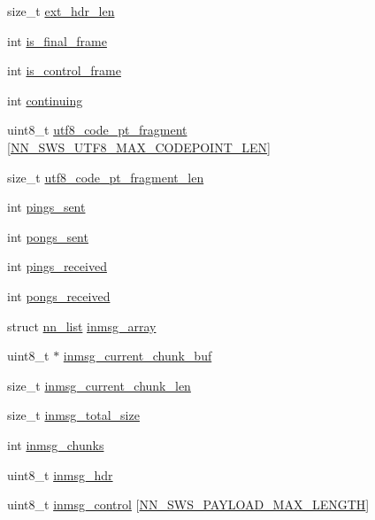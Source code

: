 \begin{DoxyCompactItemize}
size\+\_\+t \hyperlink{structnn__sws_ae899440bdfb42d398c22837861363f56}{ext\+\_\+hdr\+\_\+len}
\item 
int \hyperlink{structnn__sws_a0d827b4645506bccdab293b894e2afd7}{is\+\_\+final\+\_\+frame}
\item 
int \hyperlink{structnn__sws_a10eeed2a35b52e0d0e07799491aab045}{is\+\_\+control\+\_\+frame}
\item 
int \hyperlink{structnn__sws_a55f4dc293eaab3194dd58e18f458c3ea}{continuing}
\item 
uint8\+\_\+t \hyperlink{structnn__sws_a3cc64cfede7585a310444e2f0b38a3ea}{utf8\+\_\+code\+\_\+pt\+\_\+fragment} \mbox{[}\hyperlink{sws_8h_ac06acfb10fdd4a84904275fc23962793}{N\+N\+\_\+\+S\+W\+S\+\_\+\+U\+T\+F8\+\_\+\+M\+A\+X\+\_\+\+C\+O\+D\+E\+P\+O\+I\+N\+T\+\_\+\+L\+EN}\mbox{]}
\item 
size\+\_\+t \hyperlink{structnn__sws_a20193a81bc65b1a5674f0abba06ed89f}{utf8\+\_\+code\+\_\+pt\+\_\+fragment\+\_\+len}
\item 
int \hyperlink{structnn__sws_a614f8a22473f113cad679dc79da6ffcc}{pings\+\_\+sent}
\item 
int \hyperlink{structnn__sws_a70ca7f3b52f6f9a54836008a2a5c5ea5}{pongs\+\_\+sent}
\item 
int \hyperlink{structnn__sws_a506b1d054787f34095db38ca164bc38a}{pings\+\_\+received}
\item 
int \hyperlink{structnn__sws_aadc14a3375721e5114418c92996cc533}{pongs\+\_\+received}
\item 
struct \hyperlink{structnn__list}{nn\+\_\+list} \hyperlink{structnn__sws_afc2ece84443c16a9d7f355f5f69ffc66}{inmsg\+\_\+array}
\item 
uint8\+\_\+t $\ast$ \hyperlink{structnn__sws_a9504843df14857080a12ee7c23619d72}{inmsg\+\_\+current\+\_\+chunk\+\_\+buf}
\item 
size\+\_\+t \hyperlink{structnn__sws_a103b33dd01d203d032ea62771d273e78}{inmsg\+\_\+current\+\_\+chunk\+\_\+len}
\item 
size\+\_\+t \hyperlink{structnn__sws_aad52890329db9cd30c89f382baab548c}{inmsg\+\_\+total\+\_\+size}
\item 
int \hyperlink{structnn__sws_a86d3aac1fb485380af609c1c99a74f01}{inmsg\+\_\+chunks}
\item 
uint8\+\_\+t \hyperlink{structnn__sws_a2ec6307aef461a355875b1b5d8f8aaee}{inmsg\+\_\+hdr}
\item 
uint8\+\_\+t \hyperlink{structnn__sws_ae8a7a63a27e046f091fd9178d928e05a}{inmsg\+\_\+control} \mbox{[}\hyperlink{sws_8h_a54b93adb2e7c0b42654aeab3ba2771e5}{N\+N\+\_\+\+S\+W\+S\+\_\+\+P\+A\+Y\+L\+O\+A\+D\+\_\+\+M\+A\+X\+\_\+\+L\+E\+N\+G\+TH}\mbox{]}

\end{DoxyCompactItemize}
